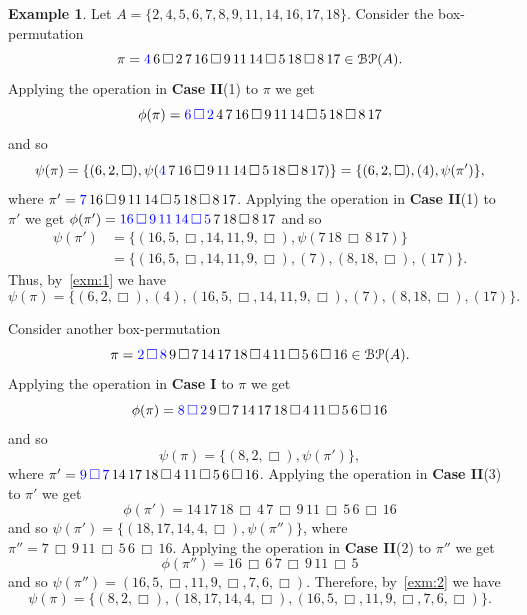 \documentclass[12pt]{amsart}
\numberwithin{equation}{section}
\def\blue{\textcolor{blue}}
\theoremstyle{plain}
\theoremstyle{definition}
\newtheorem{example}[theorem]{Example}
\newcommand{\BP}{\mathcal{BP}}
\begin{document}
\begin{example}Let $A=\{2,4,5,6,7,8,9,11,14,16,17,18\}$. Consider the box-permutation
$$
\pi=\blue{4}\,6\,\Box\,2\,7\,16\,\Box\,9\,11\,14\,\Box\,5\,18\,\Box\,8\,17\in\BP(A). 
$$
Applying the operation in {\bf Case II}(1) to $\pi$ we get 
$$\phi(\pi)=\blue{6\,\Box\,2}\,4\,7\,16\,\Box\,9\,11\,14\,\Box\,5\,18\,\Box\,8\,17$$
and so 
\begin{equation}\label{exm:1}
\psi(\pi)=\{(6,2,\Box),\psi(\blue{4}\,7\,16\,\Box\,9\,11\,14\,\Box\,5\,18\,\Box\,8\,17)\}=\{(6,2,\Box),(4),\psi(\pi')\},
\end{equation}
where $\pi'=\blue{7}\,16\,\Box\,9\,11\,14\,\Box\,5\,18\,\Box\,8\,17$. 
Applying the operation in {\bf Case II}(1) to $\pi'$  we get
$
\phi(\pi')=\blue{16\,\Box\,9\,11\,14\,\Box\,5}\,7\,18\,\Box\,8\,17
$
and so 
\begin{align*}
\psi(\pi')&=\{(16,5,\Box,14,11,9,\Box),\psi(7\,18\,\Box\,8\,17)\}\\
&=\{(16,5,\Box,14,11,9,\Box),(7),(8,18,\Box),(17)\}.
\end{align*}
Thus,  by~\eqref{exm:1} we have 
\begin{equation}\label{exm:box}
\psi(\pi)=\{(6,2,\Box),(4),(16,5,\Box,14,11,9,\Box),(7),(8,18,\Box),(17)\}.
\end{equation}

Consider another box-permutation
$$
\pi=\blue{2\,\Box\,8}\,9\,\Box\,7\,14\,17\,18\,\Box\,4\,11\,\Box\,5\,6\,\Box\,16\in\BP(A). 
$$
Applying the operation in {\bf Case I} to $\pi$ we get 
$$\phi(\pi)=\blue{8\,\Box\,2}\,9\,\Box\,7\,14\,17\,18\,\Box\,4\,11\,\Box\,5\,6\,\Box\,16$$
and so 
\begin{equation}\label{exm:2}
\psi(\pi)=\{(8,2,\Box),\psi(\pi')\},
\end{equation}
where $\pi'=\blue{9\,\Box\,7}\,14\,17\,18\,\Box\,4\,11\,\Box\,5\,6\,\Box\,16$. Applying the operation in {\bf Case II}(3) to $\pi'$ we get 
$$
\phi(\pi')=14\,17\,18\,\Box\,4\,7\,\Box\,9\,11\,\Box\,5\,6\,\Box\,16
$$
and so $\psi(\pi')=\{(18,17,14,4,\Box),\psi(\pi'')\}$, where $\pi''=7\,\Box\,9\,11\,\Box\,5\,6\,\Box\,16$. Applying the operation in {\bf Case II}(2) to $\pi''$ we get 
$$
\phi(\pi'')=16\,\Box\,6\,7\,\Box\,9\,11\,\Box\,5
$$ and so $\psi(\pi'')=(16,5,\Box,11,9,\Box,7,6,\Box)$. Therefore, by~\eqref{exm:2} we have  
\begin{equation}\label{exm2:box}
\psi(\pi)=\{(8,2,\Box),(18,17,14,4,\Box),(16,5,\Box,11,9,\Box,7,6,\Box)\}.
\end{equation}
\end{example}
\end{document}
